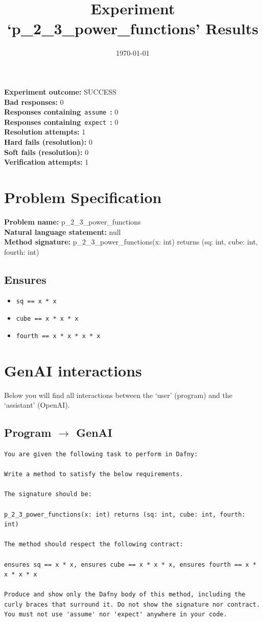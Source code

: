 \documentclass{article}
\begin{document}
\title{Experiment `p\_2\_3\_power\_functions' Results}
\author{\today}
\date{}
\maketitle
\textbf{Experiment outcome: }SUCCESS
\\\textbf{Bad responses: }0
\\\textbf{Responses containing}~\texttt{assume}~\textbf{: }0
\\\textbf{Responses containing}~\texttt{expect}~\textbf{: }0
\\\textbf{Resolution attempts: }1
\\\textbf{Hard fails (resolution): }0
\\\textbf{Soft fails (resolution): }0
\\\textbf{Verification attempts: }1
\section*{Problem Specification}
\textbf{Problem name: }p\_2\_3\_power\_functions
\\\textbf{Natural language statement: }null
\\\textbf{Method signature: }p\_2\_3\_power\_functions(x: int) returns (sq: int, cube: int, fourth: int)
\subsection*{Ensures}
\begin{itemize}
\item \texttt{sq == x * x}
\item \texttt{cube == x * x * x}
\item \texttt{fourth == x * x * x * x}
\end{itemize}
\clearpage
\section*{GenAI interactions}
Below you will find all interactions between the `user' (program) and the `assistant' (OpenAI).
\subsection*{Program $\rightarrow$ GenAI}
\begin{lstlisting}
You are given the following task to perform in Dafny:

Write a method to satisfy the below requirements.

The signature should be:

p_2_3_power_functions(x: int) returns (sq: int, cube: int, fourth: int)

The method should respect the following contract:

ensures sq == x * x, ensures cube == x * x * x, ensures fourth == x * x * x * x

Produce and show only the Dafny body of this method, including the curly braces that surround it. Do not show the signature nor contract. You must not use 'assume' nor 'expect' anywhere in your code.
\end{lstlisting}
\end{document}
